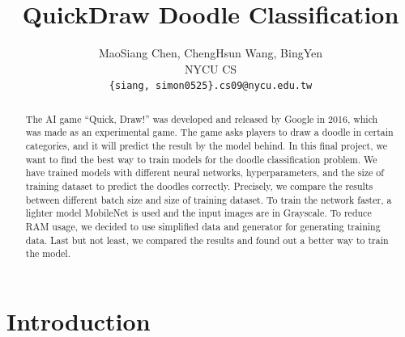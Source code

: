 \documentclass[10pt,twocolumn,letterpaper]{article}
\begin{document}
\title{QuickDraw Doodle Classification}

\author{
MaoSiang Chen, ChengHsun Wang, BingYen\\
NYCU CS\\
{\tt\small \{siang, simon0525\}.cs09@nycu.edu.tw}
%
}


\maketitle

\begin{abstract}
The AI game ``Quick, Draw!'' was developed and released by Google in 2016, 
which was made as an experimental game. 
The game asks players to draw a doodle in certain categories,
and it will predict the result by the model behind. 
In this final project, 
we want to find the best way to train models for the doodle classification problem. 
We have trained models with different neural networks, hyperparameters, 
and the size of training dataset to predict the doodles correctly. 
Precisely, we compare the results between different batch size and size of training dataset.
To train the network faster, 
a lighter model MobileNet is used and the input images are in Grayscale.
To reduce RAM usage, we decided to use simplified data and generator for generating training data.
Last but not least, we compared the results and found out a better way to train the model.

\end{abstract}




\section{Introduction}
\end{document}
